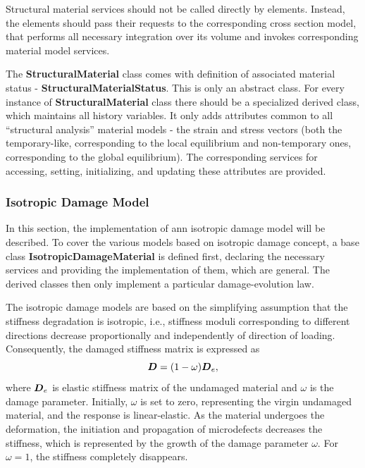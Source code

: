 \documentclass[a4paper]{article}
\newcommand{\class}[1]{{\bf #1}}
\newcommand{\mbf}[1]{\mbox{\boldmath$#1$}}
\begin{document}
 Structural material services should not be called directly by
 elements. Instead, the elements should 
 pass their requests to the corresponding cross section model, that performs all necessary integration over 
 its volume and invokes corresponding material model services.

 The \class{StructuralMaterial} class comes with definition of
 associated material status - \class{StructuralMaterialStatus}.
 This is only an abstract class. For every instance of
 \class{StructuralMaterial} class 
 there should be a specialized derived class, which maintains all history variables.
 It only adds attributes common to all ``structural analysis'' material models - the
 strain and stress vectors (both the temporary-like, corresponding to
 the local
 equilibrium and non-temporary ones, corresponding to the global equilibrium). The corresponding services
 for accessing, setting, initializing, and updating these attributes are provided.

 \subsubsection{Isotropic Damage Model}
 In this section, the implementation of ann isotropic damage model will be
 described. To cover the various models based on isotropic damage concept,
 a base class \class{IsotropicDamageMaterial} is defined first,
 declaring the necessary services and providing the implementation of
 them, which are general. The derived classes then only  implement a particular
 damage-evolution law.

 The isotropic damage models are based on the simplifying assumption
 that the stiffness degradation is isotropic, i.e., stiffness moduli
 corresponding to different directions decrease proportionally and
 independently of direction of loading. Consequently, the damaged
 stiffness matrix is expressed as
 $$
   \mbf{D} = (1-\omega)\mbf{D}_e,
 $$
 where $\mbf{D}_e$ is elastic stiffness matrix of the undamaged
 material and $\omega$ is the damage parameter. Initially, $\omega$ is
 set to zero, representing the virgin undamaged material, and the response is
 linear-elastic. As the material undergoes the deformation, the
 initiation and propagation of microdefects decreases the stiffness,
 which is represented by the growth of the damage parameter $\omega$.
 For $\omega = 1$, the stiffness completely disappears.
\end{document}
